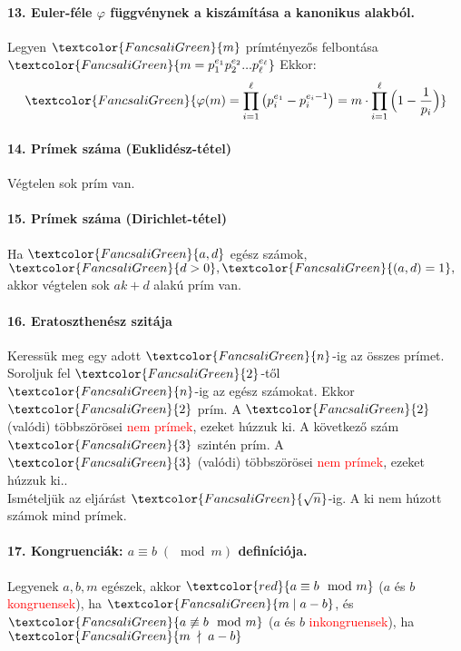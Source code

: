 \documentclass[10pt,a4paper]{article}
\renewcommand{\>}{\rightarrow}
\newcommand{\mmod}[2]{#1  \mid #2}
\newcommand{\n}{\gr{n}}
\newcommand{\red}[1]{\textcolor{red}{#1}}
\newcommand{\gr}[1]{\textcolor{FancsaliGreen}{#1}}
\newenvironment{m}
    {\begin{center}
    \begin{mdframed}[backgroundcolor=FancsaliBlue]
    }
    { 
    \end{mdframed}
    \end{center}
    }
\begin{document}
\paragraph{13. Euler-féle $\varphi$ függvénynek a kiszámítása a kanonikus alakból.}
\begin{m}
Legyen $\gr{m}$ prímtényezős felbontása $\gr{m=p_1^{e_1}p_2^{e_2}...p_\ell^{e_\ell}}$ Ekkor:
\[
\gr{\varphi (m) = \prod\limits_{i=1}^\ell \big(p_i^{e_1}-p_i^{e_i -1}\big)= m\cdot \prod\limits_{i=1}^\ell \Big(1-\frac{1}{p_i}\Big) }
\]
\end{m}
\paragraph{14. Prímek száma (Euklidész-tétel)}
\begin{m}
Végtelen sok prím van.
\end{m}
\paragraph{15. Prímek száma (Dirichlet-tétel)}
\begin{m}
Ha $\gr{a,d}$ egész számok, $\gr{d>0}, \gr{(a,d)=1},$ akkor végtelen sok $ak+d$ alakú prím van. 
\end{m}
\paragraph{16. Eratoszthenész szitája}
\begin{m}
Keressük meg egy adott $\n$-ig az összes prímet. Soroljuk fel $\gr{2}$-től $\n$-ig az egész számokat. Ekkor $\gr{2}$ prím. A $\gr{2}$ (valódi) többszörösei \red{nem prímek}, ezeket húzzuk ki. A következő szám $\gr{3}$ szintén prím. A $\gr{3}$ (valódi) többszörösei \red{nem prímek}, ezeket húzzuk ki.. \\
Ismételjük az eljárást $\gr{\sqrt{n}}$-ig. A ki nem húzott számok mind prímek.
\end{m}
\newpage
\paragraph{17. Kongruenciák: $a \equiv b \;(\mod m)$ definíciója.}
\begin{m}
Legyenek $a,b,m$ egészek, akkor $\red{a \equiv b \mod m}$ ($a$ és $b$	\red{kongruensek}), ha $\gr{ \mmod{m}{a}- b}$, és $\gr{a\not\equiv b \mod m}$  ($a$ és $b$ \red{inkongruensek}), ha $\gr{m \; \nmid \; a-b}$
\end{m}
\end{document}
